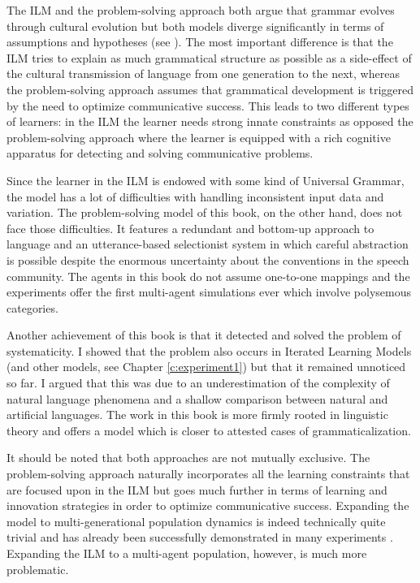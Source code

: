 The ILM and the problem-solving approach both argue that grammar evolves through cultural evolution but both models diverge significantly in terms of assumptions and hypotheses (see ). The most important difference is that the ILM tries to explain as much grammatical structure as possible as a side-effect of the cultural transmission of language from one generation to the next, whereas the problem-solving approach assumes that grammatical development is triggered by the need to optimize communicative success. This leads to two different types of learners: in the ILM the learner needs strong innate constraints as opposed the problem-solving approach where the learner is equipped with a rich cognitive apparatus for detecting and solving communicative problems.

Since the learner in the ILM is endowed with some kind of Universal Grammar, the model has a lot of difficulties with handling inconsistent input data and variation. The problem-solving model of this book, on the other hand, does not face those difficulties. It features a redundant and bottom-up approach to language and an utterance-based selectionist system in which careful abstraction is possible despite the enormous uncertainty about the conventions in the speech community. The agents in this book do not assume one-to-one mappings and the experiments offer the first multi-agent simulations ever which involve polysemous categories.

Another achievement of this book is that it detected and solved the problem of systematicity. I showed that the problem also occurs in Iterated Learning Models (and other models, see Chapter \ref{c:experiment1}) but that it remained unnoticed so far. I argued that this was due to an underestimation of the complexity of natural language phenomena and a shallow comparison between natural and artificial languages. The work in this book is more firmly rooted in linguistic theory and offers a model which is closer to attested cases of grammaticalization.

It should be noted that both approaches are not mutually exclusive. The problem-solving approach naturally incorporates all the learning constraints that are focused upon in the ILM but goes much further in terms of learning and innovation strategies in order to optimize communicative success. Expanding the model to multi-generational population dynamics is indeed technically quite trivial and has already been successfully demonstrated in many experiments \citep[e.g.][]{debeule08emergence, steels99spatially}. Expanding the ILM to a multi-agent population, however, is much more problematic.



